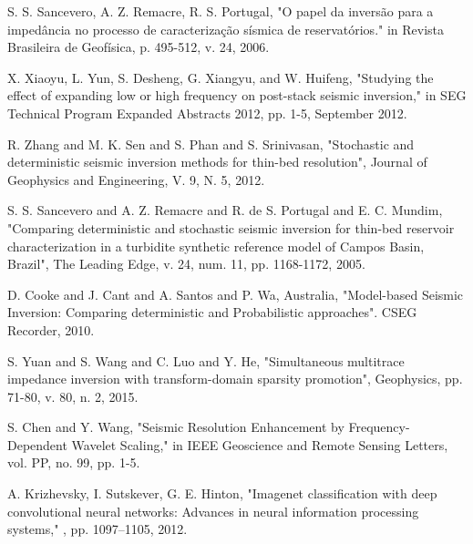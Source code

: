 \documentclass[journal]{IEEEtran}
\begin{document}
%
%
%
\begin{thebibliography}{1}
S. S. Sancevero, A. Z. Remacre, R. S. Portugal, "O papel da inversão para a impedância no processo de caracterização sísmica de reservatórios." in Revista Brasileira de Geofísica, p. 495-512, v. 24, 2006.

X. Xiaoyu, L. Yun, S. Desheng, G. Xiangyu, and W. Huifeng, "Studying the effect of expanding low or high frequency on post-stack seismic inversion," in SEG Technical Program Expanded Abstracts 2012, pp. 1-5, September 2012.

R. Zhang and M. K. Sen and S. Phan and S. Srinivasan, "Stochastic and deterministic seismic inversion methods for thin-bed resolution", Journal of Geophysics and Engineering, V. 9, N. 5, 2012.

S. S. Sancevero and A. Z. Remacre and R. de S. Portugal and E. C. Mundim, "Comparing deterministic and stochastic seismic inversion for thin-bed reservoir characterization in a turbidite synthetic reference model of Campos Basin, Brazil", The Leading Edge, v. 24, num. 11, pp. 1168-1172, 2005. 

D. Cooke and J. Cant and A. Santos and  P. Wa, Australia,  "Model-based Seismic Inversion: Comparing deterministic and Probabilistic approaches". CSEG Recorder, 2010. 

S. Yuan and S. Wang and C. Luo and Y. He, "Simultaneous multitrace impedance inversion with transform-domain sparsity promotion", Geophysics, pp. 71-80, v. 80, n. 2, 2015.

S. Chen and Y. Wang, "Seismic Resolution Enhancement by Frequency-Dependent Wavelet Scaling," in IEEE Geoscience and Remote Sensing Letters, vol. PP, no. 99, pp. 1-5.

A. Krizhevsky, I. Sutskever, G. E. Hinton, "Imagenet classification with deep convolutional neural networks: Advances in neural information processing systems," , pp. 1097–1105, 2012.


\end{thebibliography}
\end{document}
